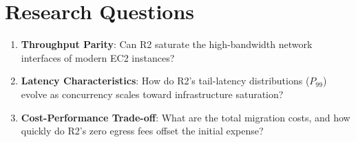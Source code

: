 \section{Research Questions}\label{sec:research-questions}

\begin{enumerate}
    \item \textbf{Throughput Parity}: Can R2 saturate the high-bandwidth network interfaces of modern EC2 instances?
    \item \textbf{Latency Characteristics}: How do R2’s tail-latency distributions ($P_{99}$) evolve as concurrency scales toward infrastructure saturation?
    \item \textbf{Cost-Performance Trade-off}: What are the total migration costs, and how quickly do R2's zero egress fees offset the initial expense?
\end{enumerate}
